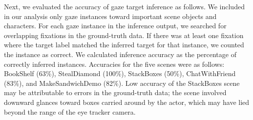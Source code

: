 Next, we evaluated the accuracy of gaze target inference as follows. We included in our analysis only gaze instances toward important scene objects and characters. For each gaze instance in the inference output, we searched for overlapping fixations in the ground-truth data. If there was at least one fixation where the target label matched the inferred target for that instance, we counted the instance as correct. We calculated inference accuracy as the percentage of correctly inferred instances. Accuracies for the five scenes were as follows: BookShelf (63\%), StealDiamond (100\%), StackBoxes (50\%), ChatWithFriend (83\%), and MakeSandwichDemo (82\%). Low accuracy of the StackBoxes scene may be attributable to errors in the ground-truth data; the scene involved downward glances toward boxes carried around by the actor, which may have lied beyond the range of the eye tracker camera.
